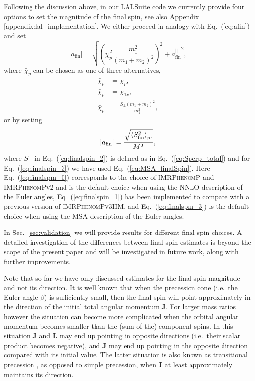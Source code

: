 \documentclass[%
aps,
prd,
amssymb,
amsmath,
amsfonts,
eqsecnum,
showpacs,
nofootinbib,
floatfix,
twocolumn,
twoside,
a4paper,
superscriptaddress
]{revtex4-1}
\newcommand{\phP}{\textsc{IMRPhenomP}\xspace}
\newcommand{\phPvtwo}{\textsc{IMRPhenomPv2}\xspace}
\newcommand{\phPvthreehm}{\textsc{IMRPhenomPv3HM}\xspace}
\begin{document}
Following the discussion above, in our LALSuite code we currently provide four options to set the magnitude of the final spin, see also Appendix \ref{appendix:lal_implementation}. We either proceed
 in analogy with Eq.~(\ref{eq:afin}) and set
\begin{equation}\label{eq:afin_LAL}
\vert a_\mathrm{fin} \vert = \sqrt{\left(\bar\chi_p^2 \frac{m_1^2}{(m_1+m_2)^2}\right)^2+ {a_\mathrm{fin}^{\vert\vert}}^2},
\end{equation}
where $\bar\chi_p$ can be chosen as one of three alternatives,
\begin{align}
   \bar\chi_p  &=  \chi_p, \label{eq:finalspin_0}\\
   \bar\chi_p  &=  \chi_{1x}, \label{eq:finalspin_1}\\
   \bar\chi_p  &=  \frac{S_{\perp} (m_1 + m_2)^2}{m_1^2}, \label{eq:finalspin_2}
\end{align}
or by setting
\begin{equation}\label{eq:finalspin_3}
 \vert a_\mathrm{fin}\vert = \frac{\sqrt{\left\langle S_\mathrm{fin}^2 \right\rangle_{\rm pr}}}{M^2},
\end{equation}
where $S_{\perp}$ in Eq.~(\ref{eq:finalspin_2}) is defined as in Eq.~(\ref{eq:Sperp_total}) and for Eq.~(\ref{eq:finalspin_3}) we have used
Eq.~(\ref{eq:MSA_finalSpin}).
Here Eq.~(\ref{eq:finalspin_0}) corresponds to the choice of \phP \cite{Hannam:2013oca} and  \phPvtwo \cite{Bohe:PPv2}
and is the default choice when using the NNLO description of the Euler angles,
Eq.~(\ref{eq:finalspin_1}) has been implemented to compare with a previous version of \phPvthreehm, and
Eq.~(\ref{eq:finalspin_3}) is the default choice when using the MSA description of the Euler angles.

In Sec.~\ref{sec:validation} we will provide results for different final spin choices. A detailed 
investigation of the differences between final spin estimates is beyond the scope of the present paper and will be investigated in future work, along with further improvements.

Note that so far we have only discussed estimates for the final spin magnitude and not its direction. It is well known that when the precession cone (i.e.~the Euler angle $\beta$) is sufficiently small, then the final spin will point approximately in the direction of the initial total angular momentum ${\mathbf J}$. For larger mass ratios however the situation can become more complicated when the orbital angular momentum becomes smaller than the (sum of the) component spins. In this situation ${\mathbf J}$ and ${\mathbf L}$ may end up pointing in opposite directions  (i.e.~their scalar product becomes negative), and ${\mathbf J}$ may end up pointing in the opposite direction compared with its initial value. The latter situation is also known as transitional precession \cite{Apostolatos:1994mx, Kidder:1995zr, Schmidt:2012rh}, as opposed to simple precession, when ${\mathbf J}$ at least approximately maintains its direction.
\end{document}
